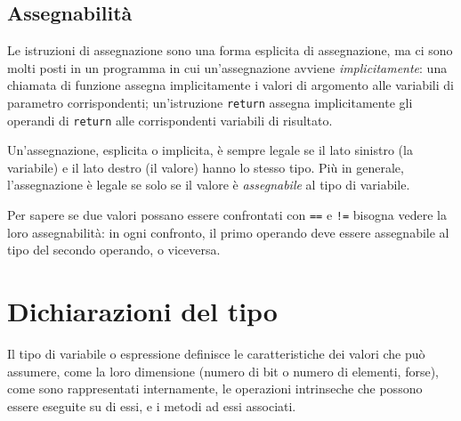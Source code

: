 \subsection{Assegnabilità}
\label{subsec:assegnabilita}%
Le istruzioni di assegnazione sono una forma esplicita di assegnazione, ma ci sono molti posti in un programma in cui un'assegnazione avviene \textit{implicitamente}: una chiamata di funzione assegna implicitamente i valori di argomento alle variabili di parametro corrispondenti;
un'istruzione \verb|return| assegna implicitamente gli operandi di \verb|return| alle corrispondenti variabili di risultato.

Un'assegnazione, esplicita o implicita, è sempre legale se il lato sinistro (la variabile) e il lato destro (il valore) hanno lo stesso tipo.
Più in generale, l'assegnazione è legale se solo se il valore è \textit{assegnabile} al tipo di variabile.

Per sapere se due valori possano essere confrontati con \verb|==| e \verb|!=| bisogna vedere la loro assegnabilità: in ogni confronto, il primo operando deve essere assegnabile al tipo del secondo operando, o viceversa.


\section{Dichiarazioni del tipo}
\label{sec:dichiarazioni_del_tipo}%
Il tipo di variabile o espressione definisce le caratteristiche dei valori che può assumere, come la loro dimensione (numero di bit o numero di elementi, forse), come sono rappresentati internamente, le operazioni intrinseche che possono essere eseguite su di essi, e i metodi ad essi associati.

